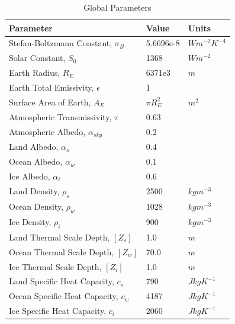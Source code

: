 \documentclass[12pt]{article}
\begin{document}
\begin{table}
    \captionsetup{singlelinecheck = false, justification=justified}
    \caption{Global Parameters}
    \begin{tabular}{lll}
    \hline
    Parameter & Value & Units\\
    \hline
    Stefan-Boltzmann Constant, $\sigma_B$ & 5.6696e-8 & $Wm^{-2}K^{-4}$ \\
    Solar Constant, $S_0$ & 1368 & $Wm^{-2}$ \\
    Earth Radius, $R_E$ & 6371e3 & $m$ \\
    Earth Total Emissivity, $\epsilon$  & 1  \\
    Surface Area of Earth, $A_E$ & $\pi R_E^2$ & $m^2$ \\
    Atmospheric Transmissivity, $\tau$ & 0.63  \\
    Atmospheric Albedo, $\alpha_{sky}$ & 0.2 \\
    Land Albedo, $\alpha_s$ & 0.4 \\
    Ocean Albedo, $\alpha_w$ & 0.1\\
    Ice Albedo, $\alpha_i$ & 0.6 \\
    Land Density, $\rho_s$ & 2500 & $kgm^{-3}$\\
    Ocean Density, $\rho_w$ & 1028 & $kgm^{-3}$\\
    Ice Density, $\rho_i$ & 900 & $kgm^{-3}$\\
    Land Thermal Scale Depth, $[Z_s]$ & 1.0 & $m$ \\
    Ocean Thermal Scale Depth, $[Z_w]$ & 70.0 & $m$ \\
    Ice Thermal Scale Depth, $[Z_i]$ & 1.0 & $m$ \\
    Land Specific Heat Capacity, $c_s$ & 790 & $JkgK^{-1}$\\
    Ocean Specific Heat Capacity, $c_w$ & 4187 & $JkgK^{-1}$\\
    Ice Specific Heat Capacity, $c_i$ & 2060 & $JkgK^{-1}$\\
    \end{tabular}
    \label{tab:globalparams}
\end{table}
\FloatBarrier
\end{document}
